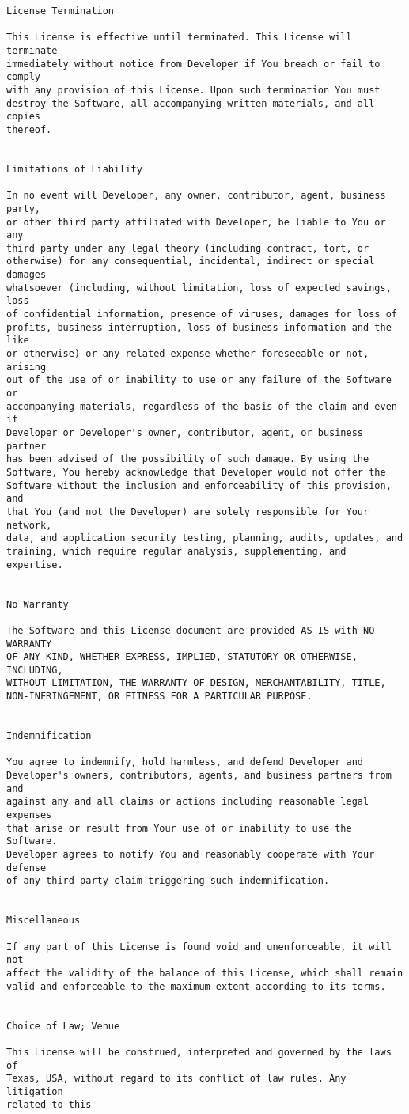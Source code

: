 \documentclass{report}
\begin{document}
{\begin{verbatim}
License Termination

This License is effective until terminated. This License will terminate 
immediately without notice from Developer if You breach or fail to comply 
with any provision of this License. Upon such termination You must 
destroy the Software, all accompanying written materials, and all copies 
thereof. 


Limitations of Liability

In no event will Developer, any owner, contributor, agent, business party, 
or other third party affiliated with Developer, be liable to You or any 
third party under any legal theory (including contract, tort, or 
otherwise) for any consequential, incidental, indirect or special damages 
whatsoever (including, without limitation, loss of expected savings, loss 
of confidential information, presence of viruses, damages for loss of 
profits, business interruption, loss of business information and the like 
or otherwise) or any related expense whether foreseeable or not, arising 
out of the use of or inability to use or any failure of the Software or 
accompanying materials, regardless of the basis of the claim and even if 
Developer or Developer's owner, contributor, agent, or business partner 
has been advised of the possibility of such damage. By using the 
Software, You hereby acknowledge that Developer would not offer the 
Software without the inclusion and enforceability of this provision, and 
that You (and not the Developer) are solely responsible for Your network, 
data, and application security testing, planning, audits, updates, and 
training, which require regular analysis, supplementing, and expertise. 


No Warranty

The Software and this License document are provided AS IS with NO WARRANTY 
OF ANY KIND, WHETHER EXPRESS, IMPLIED, STATUTORY OR OTHERWISE, INCLUDING, 
WITHOUT LIMITATION, THE WARRANTY OF DESIGN, MERCHANTABILITY, TITLE, 
NON-INFRINGEMENT, OR FITNESS FOR A PARTICULAR PURPOSE. 


Indemnification

You agree to indemnify, hold harmless, and defend Developer and 
Developer's owners, contributors, agents, and business partners from and 
against any and all claims or actions including reasonable legal expenses 
that arise or result from Your use of or inability to use the Software. 
Developer agrees to notify You and reasonably cooperate with Your defense 
of any third party claim triggering such indemnification. 


Miscellaneous

If any part of this License is found void and unenforceable, it will not 
affect the validity of the balance of this License, which shall remain 
valid and enforceable to the maximum extent according to its terms. 


Choice of Law; Venue

This License will be construed, interpreted and governed by the laws of 
Texas, USA, without regard to its conflict of law rules. Any litigation 
related to this
\end{verbatim}}
\end{document}

